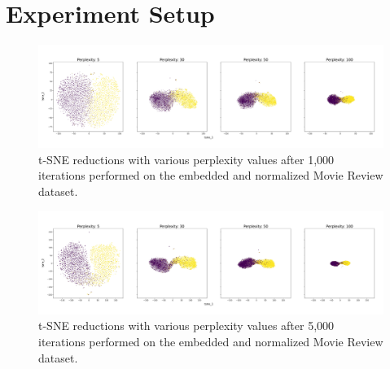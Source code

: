 \documentclass[english,bachelor,ul]{webisthesis} %
\begin{document}
\newpage 

\section{Experiment Setup}



\iffalse
\begin{figure}[htbp]
    \centering
    \includegraphics[width=1\textwidth]{img/reductions-mr-1000.jpg}
    \caption{t-SNE reductions with various perplexity values after 1,000 iterations performed on the embedded and normalized Movie Review dataset.}
    \label{fig:reductions-mr-1000}
\end{figure}

\begin{figure}[htbp]
    \centering
    \includegraphics[width=1\textwidth]{img/reductions-mr-5000.jpg}
    \caption{t-SNE reductions with various perplexity values after 5,000 iterations performed on the embedded and normalized Movie Review dataset.}
    \label{fig:reductions-mr-5000}
\end{figure}
\end{document}

